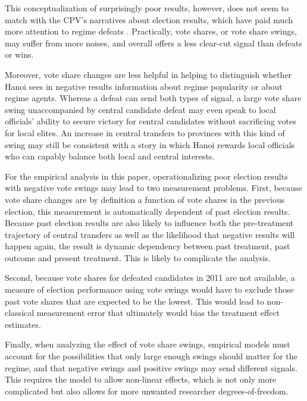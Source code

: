 \documentclass[12pt]{article}
\newcommand{\1}{\mathbbm{1}}
\begin{document}
This conceptualization of surprisingly poor results, however, does not seem to match with the CPV's narratives about election results, which have paid much more attention to regime defeats \citep[][e.g]{vov2016, laodong2016}. Practically, vote shares, or vote share swings, may suffer from more noises, and overall offers a less clear-cut signal than defeats or wins.

Moreover, vote share changes are less helpful in helping to distinguish whether Hanoi sees in negative results information about regime popularity or about regime agents. Whereas a defeat can send both types of signal, a large vote share swing unaccompanied by central candidate defeat may even speak to local officials' ability to secure victory for central candidates without sacrificing votes for local elites. An increase in central transfers to provinces with this kind of swing may still be consistent with a story in which Hanoi rewards local officials who can capably balance both local and central interests.

For the empirical analysis in this paper, operationalizing poor election results with negative vote swings may lead to two measurement problems. First, because vote share changes are by definition a function of vote shares in the previous election, this measurement is automatically dependent of past election results. Because past election results are also likely to influence both the pre-treatment trajectory of central transfers as well as the likelihood that negative results will happen again, the result is dynamic dependency between past treatment, past outcome and present treatment. This is likely to complicate the analysis.

Second, because vote shares for defeated candidates in 2011 are not available, a measure of election performance using vote swings would have to exclude those past vote shares that are expected to be the lowest. This would lead to non-classical measurement error that ultimately would bias the treatment effect estimates.

Finally, when analyzing the effect of vote share swings, empirical models must account for the possibilities that only large enough swings should matter for the regime, and that negative swings and positive swings may send different signals. This requires the model to allow non-linear effects, which is not only more complicated but also allows for more unwanted researcher degrees-of-freedom.
\end{document}
